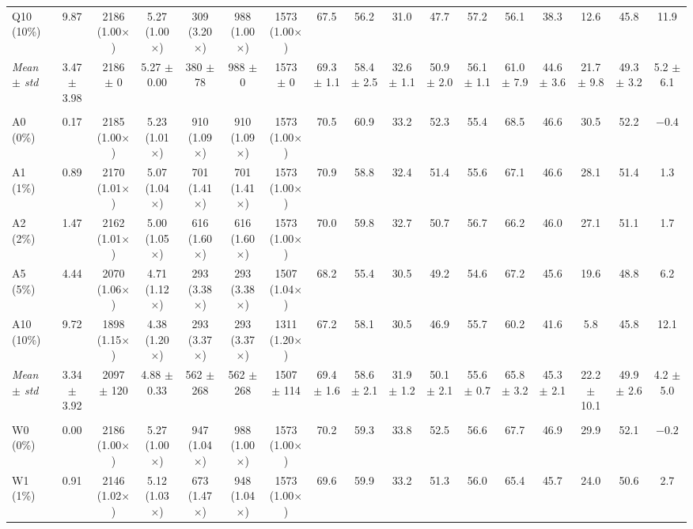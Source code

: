 \documentclass[11pt]{article}
\begin{document}
\begin{landscape}
\begin{table}[!ht]
{\begin{tabular}{lcccccccccccccccc}
Q10 (10\%) & 9.87 & 2186 (1.00$\times$) & 5.27 (1.00$\times$) & 309 (3.20$\times$) & 988 (1.00$\times$) & 1573 (1.00$\times$) & 67.5 & 56.2 & 31.0 & 47.7 & 57.2 & 56.1 & 38.3 & 12.6 & 45.8 & 11.9 \\
\emph{Mean $\pm$ std} & 3.47 $\pm$ 3.98 & 2186 $\pm$ 0 & 5.27 $\pm$ 0.00 & 380 $\pm$ 78 & 988 $\pm$ 0 & 1573 $\pm$ 0 & 69.3 $\pm$ 1.1 & 58.4 $\pm$ 2.5 & 32.6 $\pm$ 1.1 & 50.9 $\pm$ 2.0 & 56.1 $\pm$ 1.1 & 61.0 $\pm$ 7.9 & 44.6 $\pm$ 3.6 & 21.7 $\pm$ 9.8 & 49.3 $\pm$ 3.2 & 5.2 $\pm$ 6.1 \\
\addlinespace
\multicolumn{17}{l}{\emph{Hardware-aware, A100, 2 objectives: fastest decode step}} \\
A0 (0\%) & 0.17 & 2185 (1.00$\times$) & 5.23 (1.01$\times$) & 910 (1.09$\times$) & 910 (1.09$\times$) & 1573 (1.00$\times$) & 70.5 & 60.9 & 33.2 & 52.3 & 55.4 & 68.5 & 46.6 & 30.5 & 52.2 & $-0.4$ \\
A1 (1\%) & 0.89 & 2170 (1.01$\times$) & 5.07 (1.04$\times$) & 701 (1.41$\times$) & 701 (1.41$\times$) & 1573 (1.00$\times$) & 70.9 & 58.8 & 32.4 & 51.4 & 55.6 & 67.1 & 46.6 & 28.1 & 51.4 & 1.3 \\
A2 (2\%) & 1.47 & 2162 (1.01$\times$) & 5.00 (1.05$\times$) & 616 (1.60$\times$) & 616 (1.60$\times$) & 1573 (1.00$\times$) & 70.0 & 59.8 & 32.7 & 50.7 & 56.7 & 66.2 & 46.0 & 27.1 & 51.1 & 1.7 \\
A5 (5\%) & 4.44 & 2070 (1.06$\times$) & 4.71 (1.12$\times$) & 293 (3.38$\times$) & 293 (3.38$\times$) & 1507 (1.04$\times$) & 68.2 & 55.4 & 30.5 & 49.2 & 54.6 & 67.2 & 45.6 & 19.6 & 48.8 & 6.2 \\
A10 (10\%) & 9.72 & 1898 (1.15$\times$) & 4.38 (1.20$\times$) & 293 (3.37$\times$) & 293 (3.37$\times$) & 1311 (1.20$\times$) & 67.2 & 58.1 & 30.5 & 46.9 & 55.7 & 60.2 & 41.6 & 5.8 & 45.8 & 12.1 \\
\emph{Mean $\pm$ std} & 3.34 $\pm$ 3.92 & 2097 $\pm$ 120 & 4.88 $\pm$ 0.33 & 562 $\pm$ 268 & 562 $\pm$ 268 & 1507 $\pm$ 114 & 69.4 $\pm$ 1.6 & 58.6 $\pm$ 2.1 & 31.9 $\pm$ 1.2 & 50.1 $\pm$ 2.1 & 55.6 $\pm$ 0.7 & 65.8 $\pm$ 3.2 & 45.3 $\pm$ 2.1 & 22.2 $\pm$ 10.1 & 49.9 $\pm$ 2.6 & 4.2 $\pm$ 5.0 \\
\addlinespace
\multicolumn{17}{l}{\emph{Mix with sharing: least stored size}} \\
W0 (0\%) & 0.00 & 2186 (1.00$\times$) & 5.27 (1.00$\times$) & 947 (1.04$\times$) & 988 (1.00$\times$) & 1573 (1.00$\times$) & 70.2 & 59.3 & 33.8 & 52.5 & 56.6 & 67.7 & 46.9 & 29.9 & 52.1 & $-0.2$ \\
W1 (1\%) & 0.91 & 2146 (1.02$\times$) & 5.12 (1.03$\times$) & 673 (1.47$\times$) & 948 (1.04$\times$) & 1573 (1.00$\times$) & 69.6 & 59.9 & 33.2 & 51.3 & 56.0 & 65.4 & 45.7 & 24.0 & 50.6 & 2.7 \\

\end{tabular}}
\end{table}
\end{landscape}
\end{document}
